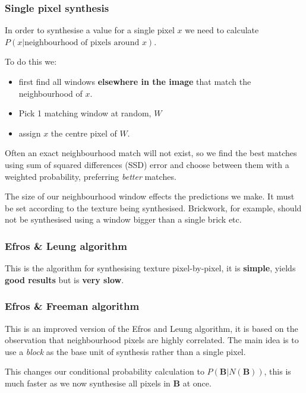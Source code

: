 \documentclass{article}
\begin{document}
\subsubsection{Single pixel synthesis}

In order to synthesise a value for a single pixel $x$ we need to calculate $P(x | \text{neighbourhood of pixels around }x)$.

To do this we:

\begin{itemize}
  \item first find all windows \textbf{elsewhere in the image} that match the neighbourhood of $x$.
  \item Pick 1 matching window at random, $W$
  \item assign $x$ the centre pixel of $W$.
\end{itemize}

Often an exact neighbourhood match will not exist, so we find the best matches using sum of squared differences (SSD) error and choose between them with a weighted probability, preferring \textit{better} matches.

The size of our neighbourhood window effects the predictions we make. It must be set according to the texture being synthesised. Brickwork, for example, should not be synthesised using a window bigger than a single brick etc.


\subsubsection{Efros \& Leung algorithm}

This is the algorithm for synthesising texture pixel-by-pixel, it is \textbf{simple}, yields \textbf{good results} but is \textbf{very slow}.

\subsubsection{Efros \& Freeman algorithm}

This is an improved version of the Efros and Leung algorithm, it is based on the observation that neighbourhood pixels are highly correlated. The main idea is to use a \textit{block} as the base unit of synthesis rather than a single pixel.

This changes our conditional probability calculation to $P(\mathbf{B} | N(\mathbf{B} ))$, this is much faster as we now synthesise all pixels in $\mathbf{B} $ at once.
\end{document}
